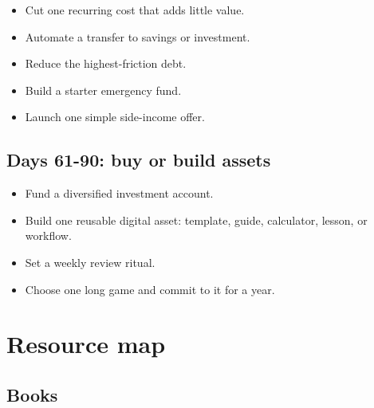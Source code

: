 \documentclass[11pt,openany]{book}
\begin{document}
\begin{itemize}
  \item Cut one recurring cost that adds little value.
  \item Automate a transfer to savings or investment.
  \item Reduce the highest-friction debt.
  \item Build a starter emergency fund.
  \item Launch one simple side-income offer.
\end{itemize}

\section{Days 61-90: buy or build assets}

\begin{itemize}
  \item Fund a diversified investment account.
  \item Build one reusable digital asset: template, guide, calculator, lesson, or workflow.
  \item Set a weekly review ritual.
  \item Choose one long game and commit to it for a year.
\end{itemize}

\chapter{Resource map}

\section{Books}
\end{document}
